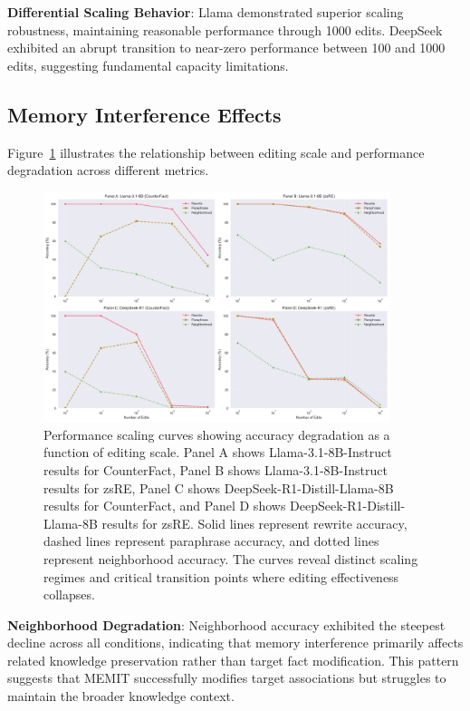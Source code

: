 \textbf{Differential Scaling Behavior}: Llama demonstrated superior scaling robustness, maintaining reasonable performance through 1000 edits. DeepSeek exhibited an abrupt transition to near-zero performance between 100 and 1000 edits, suggesting fundamental capacity limitations.

\subsection{Memory Interference Effects}
\label{subsec:memory_interference}

Figure~\ref{fig:scaling_curves} illustrates the relationship between editing scale and performance degradation across different metrics.

\begin{figure}[H]
\centering
\includegraphics[width=0.9\textwidth]{figures/scaling_curves.png}
\caption[MEMIT Performance Scaling Curves]{Performance scaling curves showing accuracy degradation as a function of editing scale. Panel A shows Llama-3.1-8B-Instruct results for CounterFact, Panel B shows Llama-3.1-8B-Instruct results for zsRE, Panel C shows DeepSeek-R1-Distill-Llama-8B results for CounterFact, and Panel D shows DeepSeek-R1-Distill-Llama-8B results for zsRE. Solid lines represent rewrite accuracy, dashed lines represent paraphrase accuracy, and dotted lines represent neighborhood accuracy. The curves reveal distinct scaling regimes and critical transition points where editing effectiveness collapses.}
\label{fig:scaling_curves}
\end{figure}

\textbf{Neighborhood Degradation}: Neighborhood accuracy exhibited the steepest decline across all conditions, indicating that memory interference primarily affects related knowledge preservation rather than target fact modification. This pattern suggests that MEMIT successfully modifies target associations but struggles to maintain the broader knowledge context.


